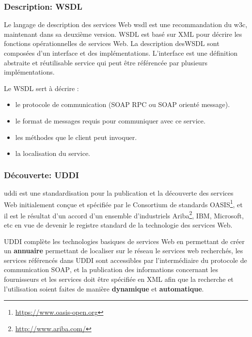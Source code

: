     \subsubsection{Description: WSDL}
    \label{sec:wsdl}
    Le langage de description des services Web \acrshort{wsdl}
    \cite{christensen2001web, chinnici2007web} est une recommandation
    du \acrshort{w3c}, maintenant dans sa deuxième version.
    \textsc{WSDL} est basé sur \textsc{XML} pour décrire les fonctions
    opérationnelles de services Web. La description des\textsc{WSDL}
    sont composées d'un interface et des implémentations. L'interface
    est une définition abstraite et réutilisable service qui peut être
    référencée par plusieurs implémentations.

    

    Le WSDL sert à décrire :
    \SpecialItem
    \begin{itemize}
      \item le protocole de communication (SOAP RPC ou SOAP orienté
        message).

      \item le format de messages requis pour communiquer avec ce
        service.

      \item les méthodes que le client peut invoquer.

      \item la localisation du service.
   \end{itemize}
   \subsubsection{Découverte: UDDI}
   \label{sec:uddi}
   \acrshort{uddi} \cite{clement2004uddi} est une standardisation pour
   la publication et la découverte des services Web initialement
   conçue et spécifiée par le Consortium de standards
   OASIS\footnote{\url{https://www.oasis-open.org}}, et il est le
   résultat d'un accord d'un ensemble d’industriels
   Ariba\footnote{\url{http://www.ariba.com/}}, IBM, Microsoft, etc en
   vue de devenir le registre standard de la technologie des services
   Web.

   \textsc{UDDI} complète les technologies basiques de services Web en
   permettant de créer un \textbf{annuaire} permettant de localiser
   sur le réseau le services web recherchés, les services référencés
   dans \textsc{UDDI} sont accessibles par l'intermédiaire du
   protocole de communication \textsc{SOAP}, et la publication des
   informations concernant les fournisseurs et les services doit être
   spécifiée en \textsc{XML} afin que la recherche et l'utilisation
   soient faites de manière \textbf{dynamique} et
   \textbf{automatique}.

